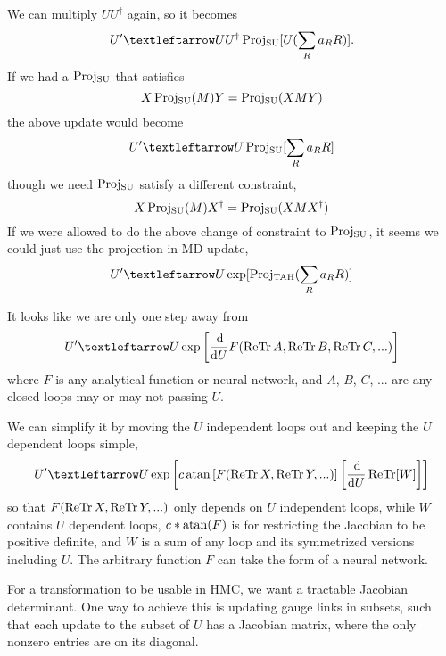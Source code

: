 We can multiply $U U^\dag$ again, so it becomes
\begin{equation}
	U' ← U { U^\dag \ProjSU[ U (\sum_R a_R R) ] }.
\end{equation}
If we had a $\operatorname{Proj_{\text{SU}}}$ that satisfies
\begin{equation}
	X \operatorname{Proj_{\text{SU}}}(M) Y = \operatorname{Proj_{\text{SU}}}(X M Y)
\end{equation}
the above update would become
\begin{equation}
	U' ← U \ProjSU[ \sum_R a_R R ]
\end{equation}
though we need $\operatorname{Proj_{\text{SU}}}$ satisfy a different constraint,
\begin{equation}
	X \operatorname{Proj_{\text{SU}}}(M) X^\dag = \operatorname{Proj_{\text{SU}}}(X M X^\dag)
\end{equation}
If we were allowed to do the above change of constraint to $\operatorname{Proj_{\text{SU}}}$, it seems we could just use the projection in MD update,
\begin{equation}
	U' ← U \exp[ \ProjTAH( \sum_R a_R R ) ]
\end{equation}

It looks like we are only one step away from
\begin{equation}
	U' ← U \exp\left[ \frac{\dd}{\dd U} F( \ReTr A, \ReTr B, \ReTr C, ... ) \right]
\end{equation}
where $F$ is any analytical function or neural network, and $A$, $B$, $C$, ... are any closed
loops may or may not passing $U$.

We can simplify it by moving the $U$ independent loops out and keeping
the $U$ dependent loops simple,
\begin{equation}
\label{eq:gen-smear}
	U' ← U \exp\left[ c \atan\left[F(\ReTr X, \ReTr Y, ...)\right] \left[\frac{\dd}{\dd U} \ReTr[W]\right] \right]
\end{equation}
so that $F(\operatorname{ReTr} X, \operatorname{ReTr} Y, ...)$ only depends on $U$ independent loops,
while $W$ contains $U$ dependent loops, $c*\operatorname{atan}(F)$ is for restricting
the Jacobian to be positive definite, and $W$ is a sum of any loop
and its symmetrized versions including $U$.
The arbitrary function $F$ can take the form of a neural network.

For a transformation to be usable in HMC, we want a tractable Jacobian determinant.
One way to achieve this is updating gauge links in subsets,
such that each update to the subset of $U$ has a Jacobian matrix,
where the only nonzero entries are on its diagonal.
